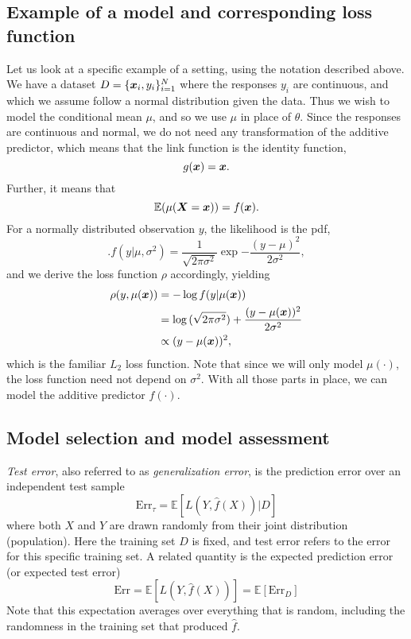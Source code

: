 \subsection{Example of a model and corresponding loss function}
Let us look at a specific example of a setting, using the notation described above. We have a dataset $D=\{\bm{x}_i,y_i\}_{i=1}^N$ where the responses $y_i$ are continuous, and which we assume follow a normal distribution given the data. Thus we wish to model the conditional mean $\mu$, and so we use $\mu$ in place of $\theta$. Since the responses are continuous and normal, we do not need any transformation of the additive predictor, which means that the link function is the identity function,
\begin{equation}
    g(\bm{x})=\bm{x}.
\end{equation}
Further, it means that
\begin{equation}
    \mathbb{E}(\mu(\bm{X}=\bm{x}))=f(\bm{x}).
\end{equation}
For a normally distributed observation $y$, the likelihood is the pdf,
\begin{equation}
    .f(y|\mu,\sigma^2)=\frac{1}{\sqrt{2\pi\sigma^2}}\exp{-\frac{(y-\mu)^2}{2\sigma^2}},
\end{equation}
and we derive the loss function $\rho$ accordingly, yielding
\begin{align*}
    \rho(y,\mu(\bm{x}))&=-\log{f(y|\mu(\bm{x}))}\\
    &=\log{(\sqrt{2\pi\sigma^2})}+\frac{(y-\mu(\bm{x}))^2}{2\sigma^2} \\
    &\propto(y-\mu(\bm{x}))^2,
\end{align*}
which is the familiar $L_2$ loss function. Note that since we will only model $\mu(\cdot)$, the loss function need not depend on $\sigma^2$. With all those parts in place, we can model the additive predictor $f(\cdot)$.

\subsection{Model selection and model assessment}
\textit{Test error}, also referred to as \textit{generalization error}, is the prediction error over an independent test sample
\begin{equation}
    \text{Err}_{\tau}=\mathbb{E}[L(Y,\hat{f}(X))|D]
\end{equation}
where both $X$ and $Y$ are drawn randomly from their joint distribution (population).
Here the training set $D$ is fixed, and test error refers to the error for this specific training set.
A related quantity is the expected prediction error (or expected test error)
\begin{equation}
    \text{Err}=\mathbb{E}[L(Y,\hat{f}(X))]=\mathbb{E}\left[\text{Err}_D\right]
\end{equation}
Note that this expectation averages over everything that is random, including the randomness in the training set that produced $\hat{f}$.

